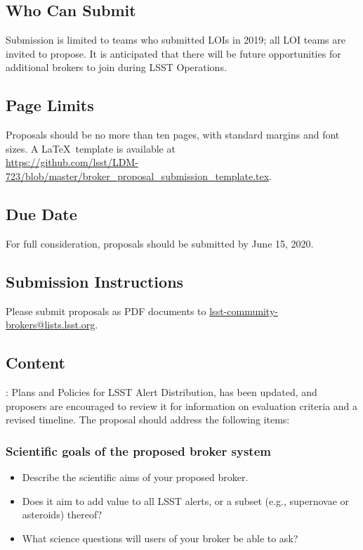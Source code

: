 \documentclass[DM,toc,lsstdraft]{lsstdoc}
\begin{document}
\subsection{Who Can Submit}

Submission is limited to teams who submitted LOIs in 2019; all LOI teams are invited to propose.
It is anticipated that there will be future opportunities for additional brokers to join during LSST Operations.

\subsection{Page Limits}

Proposals should be no more than ten pages, with standard margins and font sizes.
A \LaTeX\ template is available at \\
\url{https://github.com/lsst/LDM-723/blob/master/broker_proposal_submission_template.tex}.

\subsection{Due Date}

For full consideration, proposals should be submitted by June 15, 2020.

\subsection{Submission Instructions}

Please submit proposals as PDF documents to \url{lsst-community-brokers@lists.lsst.org}.

\subsection{Content}


: Plans and Policies for LSST Alert Distribution, has been updated, and proposers are encouraged to review it for information on evaluation criteria and a revised timeline.
The proposal should address the following items:

\subsubsection{Scientific goals of the proposed broker system}

\begin{itemize}
\item Describe the scientific aims of your proposed broker. 
\item Does it aim to add value to all LSST alerts, or a subset (e.g., supernovae or asteroids) thereof?
\item What science questions will users of your broker be able to ask?
\end{itemize}
\end{document}
